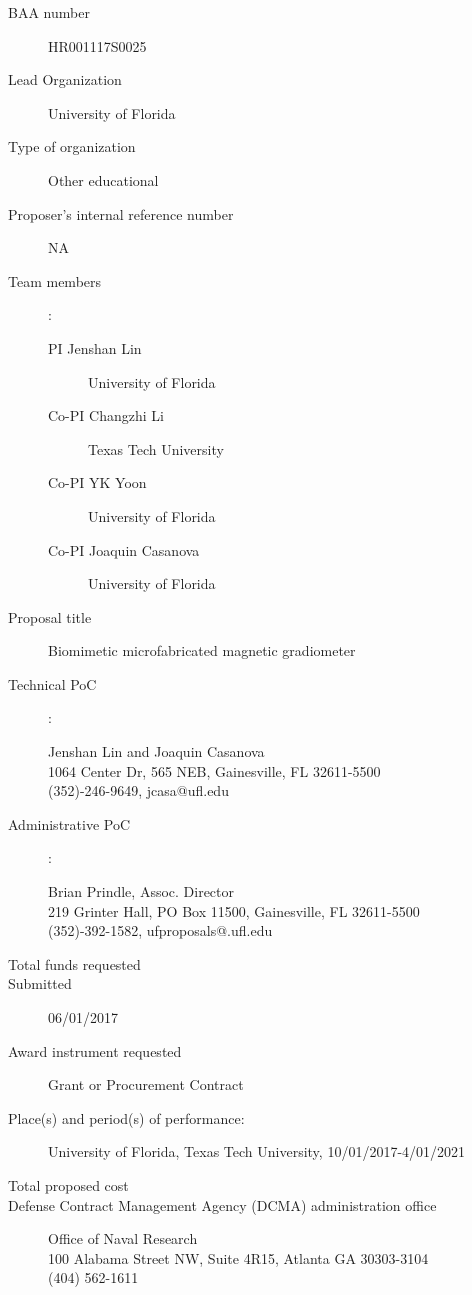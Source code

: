\begin{description}
\item [BAA number] HR001117S0025
\item [Lead Organization] University of Florida
\item [Type of organization] Other educational
\item [Proposer’s internal reference number] NA
\item [Team members]:
  \begin{description}
  \item [PI Jenshan Lin] University of Florida 
  \item [Co-PI Changzhi Li] Texas Tech University
  \item [Co-PI YK Yoon] University of Florida 
  \item [Co-PI Joaquin Casanova] University of Florida 
  \end{description}
\item [Proposal title] Biomimetic microfabricated magnetic gradiometer
\item [Technical PoC]:
  \begin{description}
  \item [Jenshan Lin and Joaquin Casanova]
  \item [1064 Center Dr, 565 NEB, Gainesville, FL 32611-5500]
  \item [(352)-246-9649, jcasa@ufl.edu]
  \end{description}
\item [Administrative PoC]:
  \begin{description}
  \item [Brian Prindle, Assoc. Director]
  \item [219 Grinter Hall, PO Box 11500, Gainesville, FL 32611-5500]
  \item [(352)-392-1582, ufproposals@.ufl.edu]
  \end{description}
\item [Total funds requested]
\item [Submitted] 06/01/2017
\item [Award instrument requested] Grant or Procurement Contract
\item [Place(s) and period(s) of performance:] University of Florida, Texas Tech University, 10/01/2017-4/01/2021
\item [Total proposed cost]
\item [Defense Contract Management Agency (DCMA) administration office]
  \begin{description}
  \item [Office of Naval Research]
  \item [100 Alabama Street NW, Suite 4R15, Atlanta GA 30303-3104]
  \item [(404) 562-1611]
  \end{description}


\end{description}
